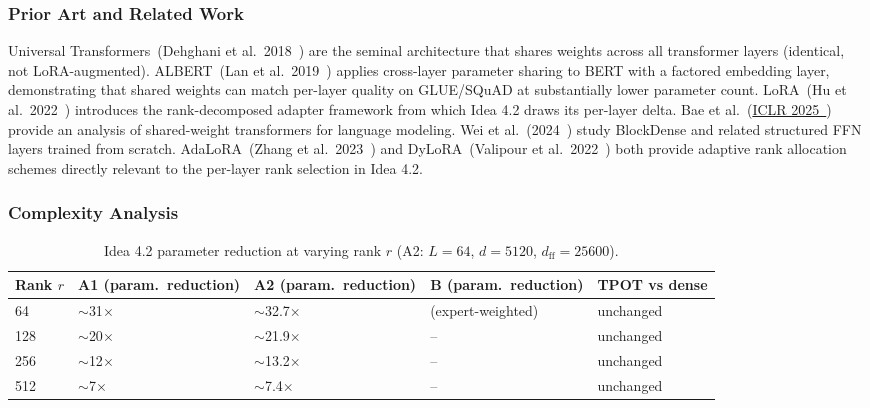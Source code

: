 \documentclass[11pt]{article}
\begin{document}
\subsubsection*{Prior Art and Related Work}

Universal Transformers~(Dehghani et al.\ 2018~\cite{DehghaniUniversalTransformer2018}) are the seminal architecture that shares weights across all transformer layers (identical, not LoRA-augmented). ALBERT~(Lan et al.\ 2019~\cite{LanALBERT2019}) applies cross-layer parameter sharing to BERT with a factored embedding layer, demonstrating that shared weights can match per-layer quality on GLUE/SQuAD at substantially lower parameter count. LoRA~(Hu et al.\ 2022~\cite{HuLoRA2022}) introduces the rank-decomposed adapter framework from which Idea 4.2 draws its per-layer delta. Bae et al.~(\href{https://openreview.net/forum?id=M6K2T5RZiD}{ICLR 2025~\cite{Bae2025ICLR}}) provide an analysis of shared-weight transformers for language modeling. Wei et al.~(2024~\cite{Wei2024BlockDense}) study BlockDense and related structured FFN layers trained from scratch. AdaLoRA~(Zhang et al.\ 2023~\cite{ZhangAdaLoRA2023}) and DyLoRA~(Valipour et al.\ 2022~\cite{ValipourDyLoRA2022}) both provide adaptive rank allocation schemes directly relevant to the per-layer rank selection in Idea 4.2.

\subsubsection*{Complexity Analysis}

\begin{table}[h]
\centering
\caption{Idea 4.2 parameter reduction at varying rank $r$ (A2: $L{=}64$, $d{=}5120$, $d_{\text{ff}}{=}25600$).}
\small
\begin{tabular}{lllll}
\toprule
Rank $r$ & A1 (param.\ reduction) & A2 (param.\ reduction) & B (param.\ reduction) & TPOT vs dense \\
\midrule
64  & $\sim$31\textbf{$\times$} & $\sim$32.7$\times$ & (expert-weighted) & unchanged \\
128 & $\sim$20$\times$ & $\sim$21.9$\times$ & -- & unchanged \\
256 & $\sim$12$\times$ & $\sim$13.2$\times$ & -- & unchanged \\
512 & $\sim$7$\times$  & $\sim$7.4$\times$  & -- & unchanged \\
\bottomrule
\end{tabular}
\end{table}
\end{document}
